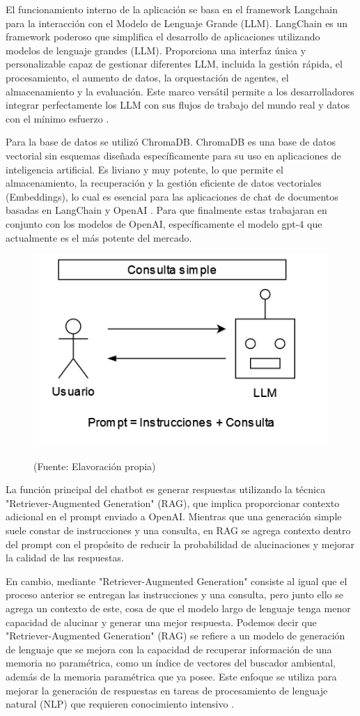 El funcionamiento interno de la aplicación se basa en el framework Langchain para la interacción con el Modelo de Lenguaje Grande (LLM). 
LangChain es un framework poderoso que simplifica el desarrollo de aplicaciones utilizando modelos de lenguaje grandes (LLM). Proporciona 
una interfaz única y personalizable capaz de gestionar diferentes LLM, incluida la gestión rápida, el procesamiento, el aumento de datos, 
la orquestación de agentes, el almacenamiento y la evaluación. Este marco versátil permite a los desarrolladores integrar perfectamente 
los LLM con sus flujos de trabajo del mundo real y datos con el mínimo esfuerzo \cite{langchain1}.

Para la base de datos se utilizó ChromaDB. ChromaDB es una base de datos vectorial sin esquemas diseñada específicamente para 
su uso en aplicaciones de inteligencia artificial. Es liviano y muy potente, lo que permite el almacenamiento, la recuperación 
y la gestión eficiente de datos vectoriales (Embeddings), lo cual es esencial para las aplicaciones de chat de documentos 
basadas en LangChain y OpenAI \cite{langchain1}. Para que finalmente estas trabajaran en conjunto con los modelos de OpenAI, 
específicamente el modelo gpt-4 que actualmente es el más potente del mercado.

\begin{figure}[ht!]
    \centering
    \includegraphics[width=.4\textwidth]{figures/huemul6.png}
    \caption[]{\\
    {\scriptsize (Fuente: Elavoración propia)}}
    \label{fig:chatbot1}
\end{figure}


La función principal del chatbot es generar respuestas utilizando la técnica "Retriever-Augmented Generation" (RAG), 
que implica proporcionar contexto adicional en el prompt enviado a OpenAI. Mientras que una generación simple suele 
constar de instrucciones y una consulta, en RAG se agrega contexto dentro del prompt con el propósito de reducir la 
probabilidad de alucinaciones y mejorar la calidad de las respuestas. 


En cambio, mediante "Retriever-Augmented Generation" 
consiste al igual que el proceso anterior se entregan las instrucciones y una consulta, pero junto ello se agrega un contexto 
de este, cosa de que el modelo largo de lenguaje tenga menor capacidad de alucinar y generar una mejor respuesta. Podemos decir
que "Retriever-Augmented Generation" (RAG) se refiere a un modelo de generación de lenguaje que se mejora con la capacidad 
de recuperar información de una memoria no paramétrica, como un índice de vectores del buscador ambiental, además de la 
memoria paramétrica que ya posee. Este enfoque se utiliza para mejorar la generación de respuestas en tareas de procesamiento 
de lenguaje natural (NLP) que requieren conocimiento intensivo \cite{raq}.


